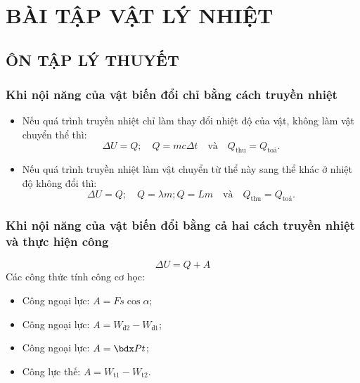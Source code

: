 \section{BÀI TẬP VẬT LÝ NHIỆT}
\subsection{ÔN TẬP LÝ THUYẾT}
\subsubsection{Khi nội năng của vật biến đổi chỉ bằng cách truyền nhiệt}
\begin{itemize}
	\item Nếu quá trình truyền nhiệt chỉ làm thay đổi nhiệt độ của vật, không làm vật chuyển thể thì:
	$$\Delta U=Q; \quad Q=mc\Delta t\quad \text{và}\quad Q_\text{thu}=Q_\text{toả}.$$
	\item Nếu quá trình truyền nhiệt làm vật chuyển từ thể này sang thể khác ở nhiệt độ không đổi thì:
	$$\Delta U=Q; \quad Q=\lambda m; Q=Lm \quad \text{và}\quad Q_\text{thu}=Q_\text{toả}.$$
\end{itemize}
\subsubsection{Khi nội năng của vật biến đổi bằng cả hai cách truyền nhiệt và thực hiện công}
$$\Delta U=Q+A$$
Các công thức tính công cơ học:
\begin{itemize}
	\item Công ngoại lực: $A=Fs\cos\alpha$;
	\item Công ngoại lực: $A=W_\text{đ2}-W_\text{đ1}$;
	\item Công ngoại lực:
	$A=\calP t$;
	\item Công lực thế: $A=W_\text{t1}-W_\text{t2}$.
\end{itemize}
